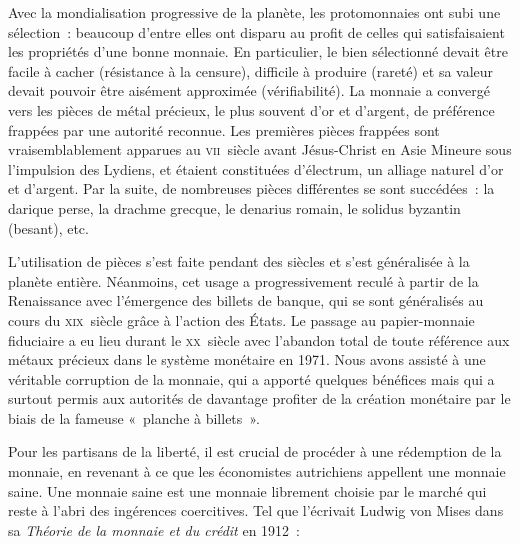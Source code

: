 Avec la mondialisation progressive de la planète, les protomonnaies ont subi une sélection~: beaucoup d'entre elles ont disparu au profit de celles qui satisfaisaient les propriétés d'une bonne monnaie. En particulier, le bien sélectionné devait être facile à cacher (résistance à la censure), difficile à produire (rareté) et sa valeur devait pouvoir être aisément approximée (vérifiabilité). La monnaie a convergé vers les pièces de métal précieux, le plus souvent d'or et d'argent, de préférence frappées par une autorité reconnue. Les premières pièces frappées sont vraisemblablement apparues au \textsc{vii}\ieme{}~siècle avant Jésus-Christ en Asie Mineure sous l'impulsion des Lydiens, et étaient constituées d'électrum, un alliage naturel d'or et d'argent. Par la suite, de nombreuses pièces différentes se sont succédées~: la darique perse, la drachme grecque, le denarius romain, le solidus byzantin (besant), etc.


L'utilisation de pièces s'est faite pendant des siècles et s'est généralisée à la planète entière. Néanmoins, cet usage a progressivement reculé à partir de la Renaissance avec l'émergence des billets de banque, qui se sont généralisés au cours du \textsc{xix}\ieme{}~siècle grâce à l'action des États. Le passage au papier-monnaie fiduciaire a eu lieu durant le \textsc{xx}\ieme{}~siècle avec l'abandon total de toute référence aux métaux précieux dans le système monétaire en 1971. Nous avons assisté à une véritable corruption de la monnaie, qui a apporté quelques bénéfices mais qui a surtout permis aux autorités de davantage profiter de la création monétaire par le biais de la fameuse «~planche à billets~». %


Pour les partisans de la liberté, il est crucial de procéder à une rédemption de la monnaie, en revenant à ce que les économistes autrichiens appellent une monnaie saine. Une monnaie saine est une monnaie librement choisie par le marché qui reste à l'abri des ingérences coercitives. Tel que l'écrivait Ludwig von Mises dans sa \emph{Théorie de la monnaie et du crédit} en 1912~:

